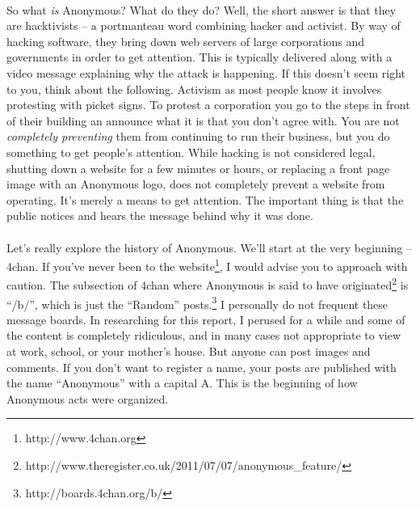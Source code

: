 \documentclass{article}
\begin{document}
\paragraph{}
So what \emph{is} Anonymous?  What do they do?  Well, the short answer is that they
are hacktivists -- a portmanteau word combining hacker and activist.  By way of 
hacking software, they bring down web servers of large corporations and governments
in order to get attention.  This is typically delivered along with a video message 
explaining why the attack is happening.  If this doesn't seem right to you, think
about the following.  Activism as most people know it involves protesting with 
picket signs. To protest a corporation you go to the steps in front of their 
building an announce what it is that you don't agree with. You are not 
\emph{completely preventing} them from continuing to run their business, but you 
do something to get people's attention.  While hacking is not considered legal, 
shutting down a website for a few minutes or hours, or replacing a front page 
image with an Anonymous logo, does not completely prevent a website from operating.
It's merely a means to get attention.  The important thing is that the public
notices and hears the message behind why it was done.

\paragraph{}
Let's really explore the history of Anonymous.  We'll start at the very 
beginning -- 4chan.  If you've never been to the website\footnote{
http://www.4chan.org}, I would advise you to approach with caution.  The subsection
of 4chan where Anonymous is said to have originated\footnote{
http://www.theregister.co.uk/2011/07/07/anonymous\_feature/} is ``/b/'', which is 
just the ``Random'' posts.\footnote{http://boards.4chan.org/b/}
I personally do not frequent these message boards.  In researching for this report,
I perused for a while and some of the content is completely ridiculous, and in many
cases not appropriate to view at work, school, or your mother's house.  But anyone
can post images and comments.  If you don't want to register a name, your
posts are published with the name ``Anonymous'' with a capital A.  This is
the beginning of how Anonymous acts were organized.

\end{document}
